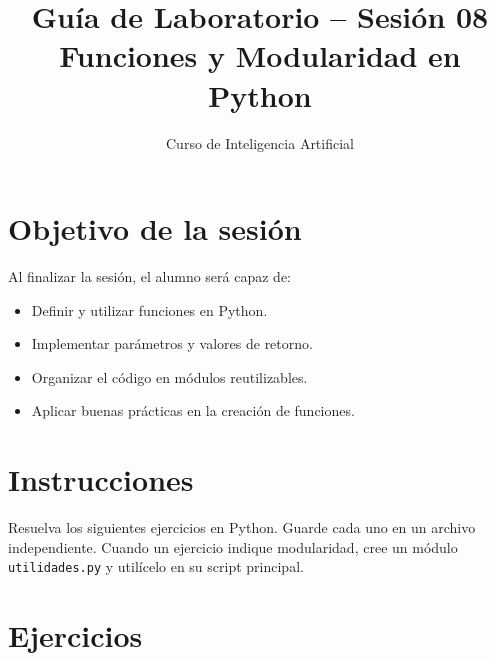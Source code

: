 \documentclass[12pt,a4paper]{article}
\title{\textbf{Guía de Laboratorio – Sesión 08} \\ Funciones y Modularidad en Python}
\author{Curso de Inteligencia Artificial}
\date{}
\begin{document}
\maketitle

\section*{Objetivo de la sesión}
Al finalizar la sesión, el alumno será capaz de:
\begin{itemize}
    \item Definir y utilizar funciones en Python.
    \item Implementar parámetros y valores de retorno.
    \item Organizar el código en módulos reutilizables.
    \item Aplicar buenas prácticas en la creación de funciones.
\end{itemize}

\section*{Instrucciones}
Resuelva los siguientes ejercicios en Python. Guarde cada uno en un archivo independiente.  
Cuando un ejercicio indique modularidad, cree un módulo \texttt{utilidades.py} y utilícelo en su script principal.

\section*{Ejercicios}
\end{document}
